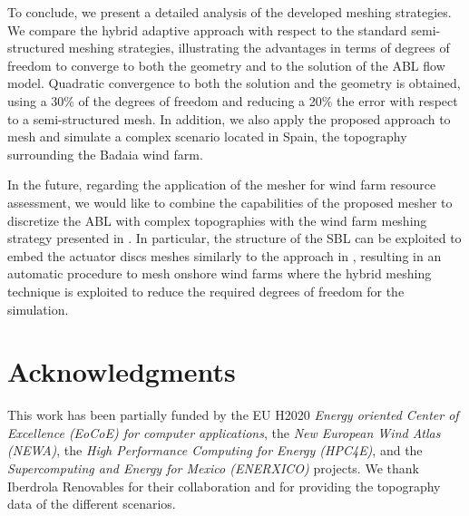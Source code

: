 \documentclass[1p]{elsarticle}
\begin{document}
To conclude, we present a detailed analysis of the developed meshing strategies. We compare the hybrid adaptive approach with respect to the standard semi-structured meshing strategies, illustrating the advantages in terms of degrees of freedom to converge to both the geometry and to the solution of the ABL flow model. Quadratic convergence to both the solution and the geometry is obtained,  using a 30\% of the degrees of freedom and reducing a 20\% the error with respect to a semi-structured mesh.
In addition, we also apply the proposed approach to mesh and simulate a complex  scenario located in Spain, the topography surrounding the Badaia wind farm.

In the future, regarding the application of the mesher for wind farm resource assessment, 
we would like to combine the capabilities of the proposed mesher to discretize the ABL with complex topographies with the wind farm meshing strategy presented in \cite{gargallo:meshForABLandWindFarms,gargallo2018JCP:WindFarms}.
In particular, the structure of the SBL can be exploited to embed the actuator discs meshes similarly to the approach in  \cite{gargallo:meshForABLandWindFarms,gargallo2018JCP:WindFarms}, resulting in an automatic procedure to mesh onshore wind farms where the hybrid meshing technique is exploited to reduce the required degrees of freedom for the simulation.

\section*{Acknowledgments}
This work has been partially funded by the EU H2020 \textit{Energy oriented Center of Excellence (EoCoE) for computer applications}, the \textit{New European Wind Atlas (NEWA)}, the \textit{High Performance Computing for Energy (HPC4E)}, and the \textit{Supercomputing and Energy for Mexico (ENERXICO)} projects. We thank Iberdrola Renovables \cite{IberdrolaRenovables} for their collaboration and for providing the topography data of the different scenarios. 


%

\end{document}
